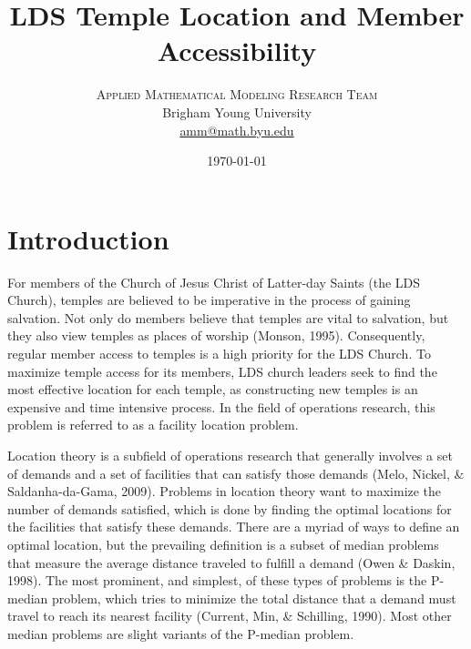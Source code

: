 \documentclass[twoside,twocolumn]{article}
\title{LDS Temple Location and Member Accessibility} %
\author{%
\textsc{Applied Mathematical Modeling Research Team}\\[1ex] %
\normalsize Brigham Young University  \\ %
\normalsize \href{mailto:amm@math.byu.edu}{amm@math.byu.edu} %
}
\date{\today} %
\begin{document}
\maketitle



\section{Introduction}

For members of the Church of Jesus Christ of Latter-day Saints (the LDS Church), temples are believed to be imperative in the process of gaining salvation.
Not only do members believe that temples are vital to salvation, but they also view temples as places of worship (Monson, 1995).
Consequently, regular member access to temples is a high priority for the LDS Church.
To maximize temple access for its members, LDS church leaders seek to find the most effective location for each temple, as constructing new temples is an expensive and time intensive process.
In the field of operations research, this problem is referred to as a facility location problem.

Location theory is a subfield of operations research that generally involves a set of demands and a set of facilities that can satisfy those demands (Melo, Nickel, \& Saldanha-da-Gama, 2009).
Problems in location theory want to maximize the number of demands satisfied, which is done by finding the optimal locations for the facilities that satisfy these demands.
There are a myriad of ways to define an optimal location, but the prevailing definition is a subset of median problems that measure the average distance traveled to fulfill a demand (Owen \& Daskin, 1998). %
The most prominent, and simplest, of these types of problems is the P-median problem, which tries to minimize the total distance that a demand must travel to reach its nearest facility (Current, Min, \& Schilling, 1990).
Most other median problems are slight variants of the P-median problem.
\end{document}
